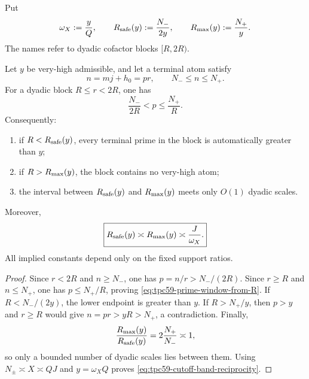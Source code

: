 Put
\begin{equation}
 \omega_X:=\frac yQ,
 \qquad
 R_{\rm safe}(y):=\frac{N_-}{2y},
 \qquad
 R_{\rm max}(y):=\frac{N_+}{y}.
 \label{eq:tpc59-omega-safe-max}
\end{equation}
The names refer to dyadic cofactor blocks \([R,2R)\).

\begin{theorem}
\label{thm:tpc59-cutoff-cofactor-reciprocity}
Let \(y\) be very-high admissible, and let a terminal atom satisfy
\begin{equation}
 n=mj+h_0=pr,
 \qquad N_-\le n\le N_+.
 \label{eq:tpc59-terminal-npr}
\end{equation}
For a dyadic block \(R\le r<2R\), one has
\begin{equation}
 \frac{N_-}{2R}<p\le\frac{N_+}{R}.
 \label{eq:tpc59-prime-window-from-R}
\end{equation}
Consequently:
\begin{enumerate}[label=\textup{(\roman*)},leftmargin=3em]
 \item if \(R<R_{\rm safe}(y)\), every terminal prime in the block is
       automatically greater than \(y\);
 \item if \(R>R_{\rm max}(y)\), the block contains no very-high atom;
 \item the interval between \(R_{\rm safe}(y)\) and
       \(R_{\rm max}(y)\) meets only \(O(1)\) dyadic scales.
\end{enumerate}
Moreover,
\begin{equation}
 \boxed{
 R_{\rm safe}(y)\asymp R_{\rm max}(y)
 \asymp\frac J{\omega_X}.}
 \label{eq:tpc59-cutoff-band-reciprocity}
\end{equation}
All implied constants depend only on the fixed support ratios.
\end{theorem}

\begin{proof}
Since \(r<2R\) and \(n\ge N_-\), one has
\(p=n/r>N_-/(2R)\).  Since \(r\ge R\) and \(n\le N_+\), one has
\(p\le N_+/R\), proving \eqref{eq:tpc59-prime-window-from-R}.  If
\(R<N_-/(2y)\), the lower endpoint is greater than \(y\).  If
\(R>N_+/y\), then \(p>y\) and \(r\ge R\) would give
\(n=pr>yR>N_+\), a contradiction.  Finally,
\[
 \frac{R_{\rm max}(y)}{R_{\rm safe}(y)}
 =2\frac{N_+}{N_-}\asymp1,
\]
so only a bounded number of dyadic scales lies between them.  Using
\(N_\pm\asymp X\asymp QJ\) and \(y=\omega_XQ\) proves
\eqref{eq:tpc59-cutoff-band-reciprocity}.
\end{proof}

